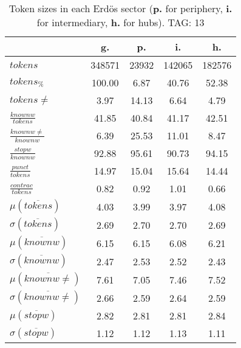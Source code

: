 \begin{table}[h!]
\begin{center}
\begin{tabular}{| l || c | c | c | c |}\hline
 & {\bf g.} & {\bf p.} & {\bf i.} & {\bf h.} \\\hline\hline
$tokens$ & 348571  & 23932  & 142065  & 182576 \\
$tokens_{\%}$ & 100.00  & 6.87  & 40.76  & 52.38 \\
$tokens \neq$ & 3.97  & 14.13  & 6.64  & 4.79 \\\hline
$\frac{knownw}{tokens}$ & 41.85  & 40.84  & 41.17  & 42.51 \\
$\frac{knownw \neq}{knownw}$ & 6.39  & 25.53  & 11.01  & 8.47 \\\hline
$\frac{stopw}{knownw}$ & 92.88  & 95.61  & 90.73  & 94.15 \\
$\frac{punct}{tokens}$ & 14.97  & 15.04  & 15.64  & 14.44 \\
$\frac{contrac}{tokens}$ & 0.82  & 0.92  & 1.01  & 0.66 \\\hline\hline
$\mu(\overline{tokens})$ & 4.03  & 3.99  & 3.97  & 4.08 \\
$\sigma(\overline{tokens})$ & 2.69  & 2.70  & 2.70  & 2.69 \\\hline
$\mu(\overline{knownw})$ & 6.15  & 6.15  & 6.08  & 6.21 \\
$\sigma(\overline{knownw})$ & 2.47  & 2.53  & 2.52  & 2.43 \\\hline
$\mu(\overline{knownw \neq})$ & 7.61  & 7.05  & 7.46  & 7.52 \\
$\sigma(\overline{knownw \neq})$ & 2.66  & 2.59  & 2.64  & 2.59 \\\hline
$\mu(\overline{stopw})$ & 2.82  & 2.81  & 2.81  & 2.84 \\
$\sigma(\overline{stopw})$ & 1.12  & 1.12  & 1.13  & 1.11 \\\hline
\end{tabular}
\caption{Token sizes in each Erd\"os sector ({{\bf p.}} for periphery, {{\bf i.}} for intermediary, {{\bf h.}} for hubs). TAG: 13}
\end{center}
\end{table}